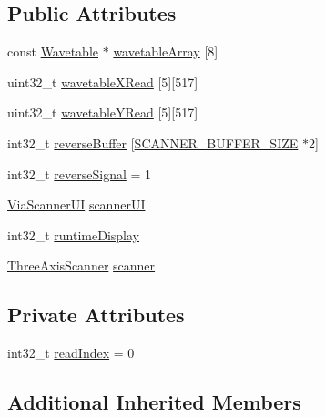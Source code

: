 \subsection*{Public Attributes}
\begin{DoxyCompactItemize}
\item 
const \mbox{\hyperlink{struct_wavetable}{Wavetable}} $\ast$ \mbox{\hyperlink{class_via_scanner_a7128d2220f6ce1278b2f31273631ac99}{wavetable\+Array}} \mbox{[}8\mbox{]}
\item 
uint32\+\_\+t \mbox{\hyperlink{class_via_scanner_a35e9caf08ba6556c32db7fc43958115d}{wavetable\+X\+Read}} \mbox{[}5\mbox{]}\mbox{[}517\mbox{]}
\item 
uint32\+\_\+t \mbox{\hyperlink{class_via_scanner_ab8d01eb2668d0e34b2f8ebb0002a69de}{wavetable\+Y\+Read}} \mbox{[}5\mbox{]}\mbox{[}517\mbox{]}
\item 
int32\+\_\+t \mbox{\hyperlink{class_via_scanner_a1e81eec84c1e70f1dc0d05f03ac6059f}{reverse\+Buffer}} \mbox{[}\mbox{\hyperlink{scanner_8hpp_a6d1fe8ce81e54d6d70e734bf39dee4b0}{S\+C\+A\+N\+N\+E\+R\+\_\+\+B\+U\+F\+F\+E\+R\+\_\+\+S\+I\+ZE}} $\ast$2\mbox{]}
\item 
int32\+\_\+t \mbox{\hyperlink{class_via_scanner_a721539f29750107fa9ca4e5b1308e584}{reverse\+Signal}} = 1
\item 
\mbox{\hyperlink{class_via_scanner_1_1_via_scanner_u_i}{Via\+Scanner\+UI}} \mbox{\hyperlink{class_via_scanner_a79510498d614c531fee5696191633c4f}{scanner\+UI}}
\item 
int32\+\_\+t \mbox{\hyperlink{class_via_scanner_adf5ae830fce9aabdb9bad283ef872be6}{runtime\+Display}}
\item 
\mbox{\hyperlink{class_three_axis_scanner}{Three\+Axis\+Scanner}} \mbox{\hyperlink{class_via_scanner_af1ec99854e4537b8c6342bb514cc0c44}{scanner}}
\end{DoxyCompactItemize}
\subsection*{Private Attributes}
\begin{DoxyCompactItemize}
\item 
int32\+\_\+t \mbox{\hyperlink{class_via_scanner_acc749be13e60aea46400173130cf7624}{read\+Index}} = 0
\end{DoxyCompactItemize}
\subsection*{Additional Inherited Members}


